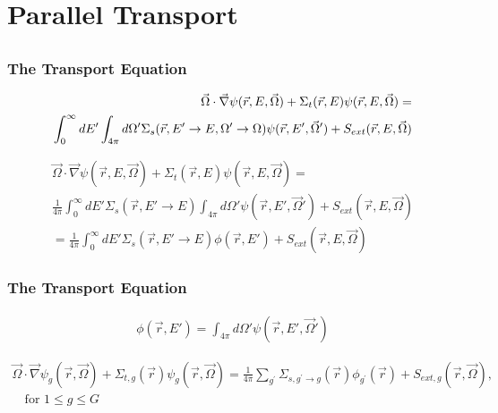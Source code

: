 \documentclass[]{beamer}
\newcommand{\vr}{\vec{r}}
\newcommand{\vo}{\vec{\Omega}}
\begin{document}

\section{Parallel Transport}
\subsection{}
\begin{frame}[t]\frametitle{The Transport Equation}
	\begin{block}{}
	\begin{align*}
\hspace{-10cm} \vo \cdot \vec \nabla \psi(\vr,E,\vo) +\Sigma_t(\vr,E) \psi(\vr,E,\vo)  = \\ \int_{0}^{\infty}dE' \int_{4\pi}d\Omega' \Sigma_s(\vr,E'\to E, \Omega'\to\Omega)\psi(\vr,E',\vo') + S_{ext}(\vr,E,\vo)
	\label{continuous transport}
	\end{align*}
	\end{block}
	\begin{block}{}
	\begin{align*}
	\vo \cdot \vec \nabla \psi(\vr,E,\vo) +\Sigma_t(\vr,E) \psi(\vr,E,\vo)  
	= \\\frac{1}{4\pi}\int_{0}^{\infty}dE' \Sigma_s(\vr,E'\to E) \int_{4\pi}d\Omega' \psi(\vr,E',\vo')  + S_{ext}(\vr,E,\vo) \nonumber \\
	 = \frac{1}{4\pi}\int_{0}^{\infty}dE' \Sigma_s(\vr,E'\to E) \phi(\vr,E')  + S_{ext}(\vr,E,\vo)
	\end{align*}
	\end{block}
\end{frame}

\begin{frame}[t]\frametitle{The Transport Equation}
	\begin{block}{}
	\begin{align*}
		\phi(\vr,E') = \int_{4\pi}d\Omega' \psi(\vr,E',\vo')
	\end{align*}
	\end{block}
	\begin{block}{}
	\begin{align*}
	\vo \cdot \vec \nabla \psi_g(\vr,\vo) +\Sigma_{t,g}(\vr) \psi_g(\vr,\vo) = \frac{1}{4\pi}\sum_{g^{\prime}}\Sigma_{s,g^{\prime}\to g}(\vr)\phi_{g^{\prime}}(\vr) + S_{ext,g}(\vr,\vo), \\\quad \text{for } 1 \le g \le G
	\end{align*}
	\end{block}
\end{frame}
\end{document}
